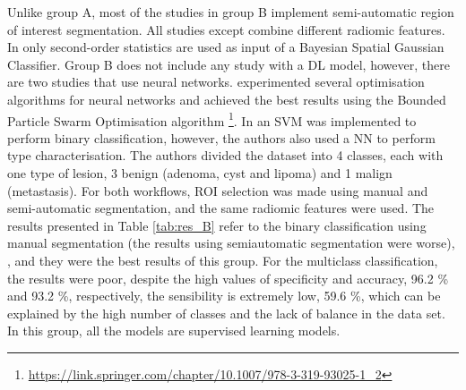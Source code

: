 \documentclass{article}
\begin{document}
Unlike group A, most of the studies in group B implement semi-automatic region
of interest segmentation. All studies except \cite{Li2019} combine different
radiomic features. In \cite{Li2019} only second-order statistics are used as
input of a Bayesian Spatial Gaussian Classifier. Group B does not include any
study with a DL model, however, there are two studies that use neural networks.
\cite{Koyuncu2019} experimented several optimisation algorithms for neural
networks and achieved the best results using the Bounded Particle Swarm
Optimisation algorithm \footnote{\href{https://link.springer.com/chapter/10.1007/978-3-319-93025-1\_2}{https://link.springer.com/chapter/10.1007/978-3-319-93025-1\_2}}. In
\cite{Barstugan2020} an SVM was implemented to perform binary classification,
however, the authors also used a NN to perform type characterisation. The
authors divided the dataset into 4 classes, each with one type of lesion, 3
benign (adenoma, cyst and lipoma) and 1 malign (metastasis). For both workflows,
ROI selection was made using manual and semi-automatic segmentation, and the
same radiomic features were used. The results presented in Table \ref{tab:res_B}
refer to the binary classification using manual segmentation (the results using semiautomatic segmentation were worse), , and they were the best results of this
group. For the multiclass classification, the results were poor, despite the
high values of specificity and accuracy, 96.2 \% and 93.2 \%, respectively, the
sensibility is extremely low, 59.6 \%, which can be explained by the high number
of classes and the lack of balance in the data set. In this group, all the
models are supervised learning models.
\end{document}
